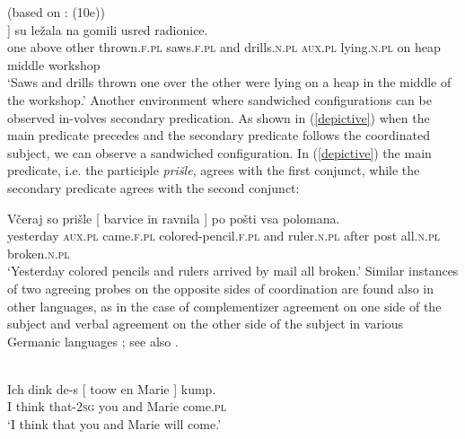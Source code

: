 \documentclass[output=paper
,modfonts
,nonflat]{langsci/langscibook}
\begin{document}
\ea \label{jednenadruge} (based on \citealt{aljovicbegovic:16}: (10e))\\
\gll [ Jedne na druge nabacane [ testere i svrdla ]]  su  ležala  na gomili usred radionice. \\
{} one above other  thrown.\textsc{f.pl} {} saws.\textsc{f.pl} and drills.\textsc{n.pl} {}  \textsc{aux.pl} lying.\textsc{n.pl} on heap  middle workshop\\
\glt `Saws and drills thrown one over the other were lying on a heap in the middle of the workshop.'
\z
Another environment where sandwiched configurations can be observed in-\linebreak volves secondary predication. As shown in (\ref{depictive}) when the main predicate precedes and the secondary predicate follows the coordinated subject, we can observe a sandwiched configuration. In (\ref{depictive}) the main predicate, i.e. the participle \textit{prišle}, agrees with the first conjunct, while the secondary predicate agrees with the second conjunct:

\ea \label{depictive}
\gll Včeraj so prišle [ barvice in ravnila ] po pošti vsa polomana.\\
yesterday \textsc{aux.pl} came.\textsc{f.pl} {} colored-pencil.\textsc{f.pl} and ruler.\textsc{n.pl} {} after post all.\textsc{n.pl} broken.\textsc{n.pl}\\
\glt `Yesterday colored pencils and rulers arrived by mail all broken.'
\z
Similar instances of two agreeing probes on the opposite sides of coordination are found also in other languages, as in the case of complementizer agreement on one side of the subject and verbal agreement on the other side of the subject in various Germanic languages \citep{koppen:05, haegemankoppen:12, bayer:12}; see also .

\ea {}\\
\gll Ich dink de-s [ toow en Marie ] kump. \\
I think that-\textsc{2sg} {} you and Marie {} come.\textsc{pl} \\
\glt `I think that you and Marie will come.'
\z
\end{document}
